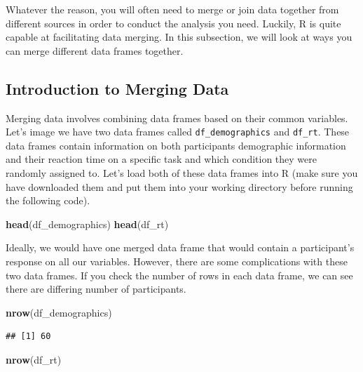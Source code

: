 \documentclass[
]{book}
\newenvironment{Shaded}{\begin{snugshade}}{\end{snugshade}}
\newcommand{\FunctionTok}[1]{\textcolor[rgb]{0.13,0.29,0.53}{\textbf{#1}}}
\newcommand{\NormalTok}[1]{#1}
\begin{document}
Whatever the reason, you will often need to merge or join data together from different sources in order to conduct the analysis you need. Luckily, R is quite capable at facilitating data merging. In this subsection, we will look at ways you can merge different data frames together.

\hypertarget{introduction-to-merging-data}{%
\subsection{Introduction to Merging Data}\label{introduction-to-merging-data}}

Merging data involves combining data frames based on their common variables. Let's image we have two data frames called \texttt{df\_demographics} and \texttt{df\_rt}. These data frames contain information on both participants demographic information and their reaction time on a specific task and which condition they were randomly assigned to. Let's load both of these data frames into R (make sure you have downloaded them and put them into your working directory before running the following code).

\begin{Shaded}
\begin{Highlighting}[]
\FunctionTok{head}\NormalTok{(df\_demographics)}
\FunctionTok{head}\NormalTok{(df\_rt)}
\end{Highlighting}
\end{Shaded}

Ideally, we would have one merged data frame that would contain a participant's response on all our variables. However, there are some complications with these two data frames. If you check the number of rows in each data frame, we can see there are differing number of participants.

\begin{Shaded}
\begin{Highlighting}[]
\FunctionTok{nrow}\NormalTok{(df\_demographics)}
\end{Highlighting}
\end{Shaded}

\begin{verbatim}
## [1] 60
\end{verbatim}

\begin{Shaded}
\begin{Highlighting}[]
\FunctionTok{nrow}\NormalTok{(df\_rt)}
\end{Highlighting}
\end{Shaded}
\end{document}

